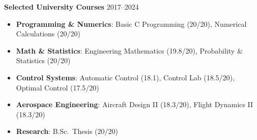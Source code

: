 \documentclass[12pt]{article}
\begin{document}


\noindent\textbf{Selected University Courses}%
\hfill 2017--2024\\
\vspace{-16pt}
\begin{itemize} \itemsep -2pt  %
  \item \textbf{Programming \& Numerics}: Basic C Programming (20/20), Numerical Calculations (20/20)
  \item \textbf{Math \& Statistics}: Engineering Mathematics (19.8/20), Probability \& Statistics (20/20)
  \item \textbf{Control Systems}: Automatic Control (18.1), Control Lab (18.5/20), Optimal Control (17.5/20)
  \item \textbf{Aerospace Engineering}: Aircraft Design II (18.3/20), Flight Dynamics II (18.3/20)
  \item \textbf{Research}: B.Sc.\ Thesis (20/20)
\end{itemize}


\end{document}

